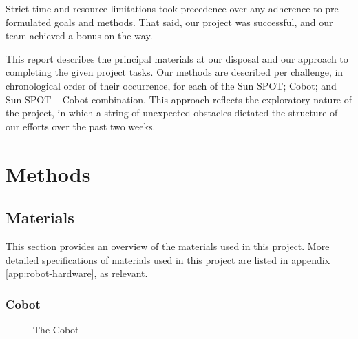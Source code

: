 \documentclass[a4paper,10pt]{article} %
\begin{document}
Strict time and resource limitations took precedence over any adherence
to pre-formulated goals and methods. That said, our project was successful,
and our team achieved a bonus on the way.

This report describes the principal materials at our disposal and our approach
to completing the given project tasks. Our methods are described per challenge,
in chronological order of their occurrence, for each of the Sun SPOT; Cobot; and
Sun SPOT -- Cobot combination. This approach reflects the exploratory nature of
the project, in which a string of unexpected obstacles dictated the structure of
our efforts over the past two weeks.


\pagebreak

\section{Methods} %

\subsection{Materials} %

This section provides an overview of the materials used in this project. More
detailed specifications of materials used in this project are listed in appendix
\ref{app:robot-hardware}, as relevant.

\subsubsection{Cobot}

\begin{figure}[h]
    \centering
    \caption{The Cobot}
    \label{fig:cobotviews}
\end{figure}
\end{document}
